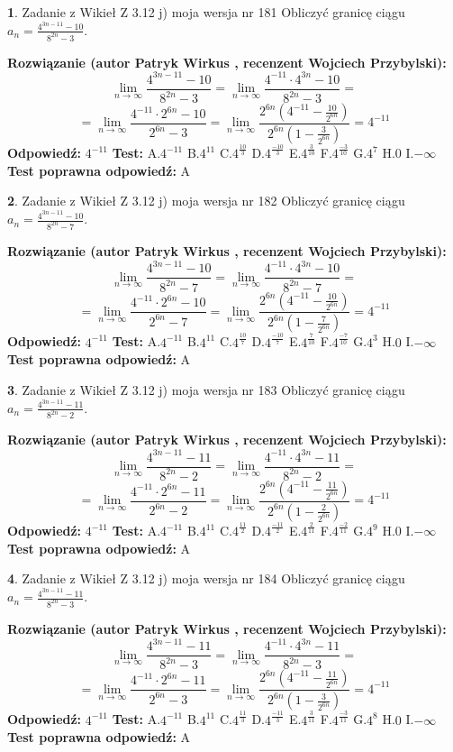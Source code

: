\documentclass[12pt, a4paper]{article}
\theoremstyle{definition} %
\newtheorem{zad}{}
\newcommand{\zadStart}[1]{\begin{zad}#1\newline}
\newcommand{\zadStop}{\end{zad}}
\newcommand{\rozwStart}[2]{\noindent \textbf{Rozwiązanie (autor #1 , recenzent #2): }\newline}
\newcommand{\rozwStop}{\newline}
\newcommand{\odpStart}{\noindent \textbf{Odpowiedź:}\newline}
\newcommand{\odpStop}{\newline}
\newcommand{\testStart}{\noindent \textbf{Test:}\newline}
\newcommand{\testStop}{\newline}
\newcommand{\kluczStart}{\noindent \textbf{Test poprawna odpowiedź:}\newline}
\newcommand{\kluczStop}{\newline}
\begin{document}
\zadStart{Zadanie z Wikieł Z 3.12 j) moja wersja nr 181}
Obliczyć granicę ciągu $a_{n}=\frac{4^{3n-11}-10}{8^{2n}-3}$.
\zadStop
\rozwStart{Patryk Wirkus}{Wojciech Przybylski}
$$\lim\limits_{n\to\infty}\frac{4^{3n-11}-10}{8^{2n}-3}= \lim\limits_{n\to\infty}\frac{4^{-11} \cdot 4^{3n}-10}{8^{2n}-3}=$$
$$= \lim\limits_{n\to\infty}\frac{4^{-11} \cdot 2^{6n}-10}{2^{6n}-3}= \lim\limits_{n\to\infty}\frac{2^{6n}(4^{-11} - \frac{10}{2^{6n}})}{2^{6n}(1-\frac{3}{2^{6n}})}= 4^{-11}$$
\rozwStop
\odpStart
$4^{-11}$
\odpStop
\testStart
A.$4^{-11}$
B.$4^{11}$
C.$4^{\frac{10}{3}}$
D.$4^{\frac{-10}{3}}$
E.$4^{\frac{3}{10}}$
F.$4^{\frac{-3}{10}}$
G.$4^{7}$
H.$0$
I.$-\infty$
\testStop
\kluczStart
A
\kluczStop



\zadStart{Zadanie z Wikieł Z 3.12 j) moja wersja nr 182}
Obliczyć granicę ciągu $a_{n}=\frac{4^{3n-11}-10}{8^{2n}-7}$.
\zadStop
\rozwStart{Patryk Wirkus}{Wojciech Przybylski}
$$\lim\limits_{n\to\infty}\frac{4^{3n-11}-10}{8^{2n}-7}= \lim\limits_{n\to\infty}\frac{4^{-11} \cdot 4^{3n}-10}{8^{2n}-7}=$$
$$= \lim\limits_{n\to\infty}\frac{4^{-11} \cdot 2^{6n}-10}{2^{6n}-7}= \lim\limits_{n\to\infty}\frac{2^{6n}(4^{-11} - \frac{10}{2^{6n}})}{2^{6n}(1-\frac{7}{2^{6n}})}= 4^{-11}$$
\rozwStop
\odpStart
$4^{-11}$
\odpStop
\testStart
A.$4^{-11}$
B.$4^{11}$
C.$4^{\frac{10}{7}}$
D.$4^{\frac{-10}{7}}$
E.$4^{\frac{7}{10}}$
F.$4^{\frac{-7}{10}}$
G.$4^{3}$
H.$0$
I.$-\infty$
\testStop
\kluczStart
A
\kluczStop



\zadStart{Zadanie z Wikieł Z 3.12 j) moja wersja nr 183}
Obliczyć granicę ciągu $a_{n}=\frac{4^{3n-11}-11}{8^{2n}-2}$.
\zadStop
\rozwStart{Patryk Wirkus}{Wojciech Przybylski}
$$\lim\limits_{n\to\infty}\frac{4^{3n-11}-11}{8^{2n}-2}= \lim\limits_{n\to\infty}\frac{4^{-11} \cdot 4^{3n}-11}{8^{2n}-2}=$$
$$= \lim\limits_{n\to\infty}\frac{4^{-11} \cdot 2^{6n}-11}{2^{6n}-2}= \lim\limits_{n\to\infty}\frac{2^{6n}(4^{-11} - \frac{11}{2^{6n}})}{2^{6n}(1-\frac{2}{2^{6n}})}= 4^{-11}$$
\rozwStop
\odpStart
$4^{-11}$
\odpStop
\testStart
A.$4^{-11}$
B.$4^{11}$
C.$4^{\frac{11}{2}}$
D.$4^{\frac{-11}{2}}$
E.$4^{\frac{2}{11}}$
F.$4^{\frac{-2}{11}}$
G.$4^{9}$
H.$0$
I.$-\infty$
\testStop
\kluczStart
A
\kluczStop



\zadStart{Zadanie z Wikieł Z 3.12 j) moja wersja nr 184}
Obliczyć granicę ciągu $a_{n}=\frac{4^{3n-11}-11}{8^{2n}-3}$.
\zadStop
\rozwStart{Patryk Wirkus}{Wojciech Przybylski}
$$\lim\limits_{n\to\infty}\frac{4^{3n-11}-11}{8^{2n}-3}= \lim\limits_{n\to\infty}\frac{4^{-11} \cdot 4^{3n}-11}{8^{2n}-3}=$$
$$= \lim\limits_{n\to\infty}\frac{4^{-11} \cdot 2^{6n}-11}{2^{6n}-3}= \lim\limits_{n\to\infty}\frac{2^{6n}(4^{-11} - \frac{11}{2^{6n}})}{2^{6n}(1-\frac{3}{2^{6n}})}= 4^{-11}$$
\rozwStop
\odpStart
$4^{-11}$
\odpStop
\testStart
A.$4^{-11}$
B.$4^{11}$
C.$4^{\frac{11}{3}}$
D.$4^{\frac{-11}{3}}$
E.$4^{\frac{3}{11}}$
F.$4^{\frac{-3}{11}}$
G.$4^{8}$
H.$0$
I.$-\infty$
\testStop
\kluczStart
A
\kluczStop
\end{document}
